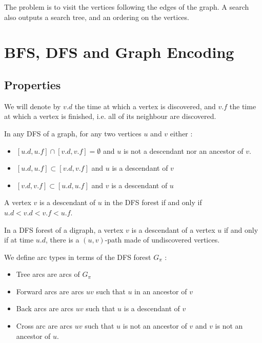 \documentclass[12pt]{cours}
\begin{document}
\begin{definition}
    The problem is to visit the vertices following the edges of the graph. A search also outputs a search tree, and an ordering on the vertices.
\end{definition}

\section{BFS, DFS and Graph Encoding}
\subsection{Properties}
\begin{definition}
    We will denote by $v.d$ the time at which a vertex is discovered, and $v.f$ the time at which a vertex is finished, i.e. all of its neighbour are discovered.
\end{definition}
\begin{theorem}
    In any DFS of a graph, for any two vertices $u$ and $v$ either :
    \begin{itemize}
        \item $\left[u.d, u.f\right]\cap \left[v.d, v.f\right] = \emptyset$ and $u$ is not a descendant nor an ancestor of $v$.
        \item $\left[u.d, u.f\right] \subset \left[v.d, v.f\right]$ and $u$ is a descendant of $v$
        \item $\left[v.d, v.f\right] \subset \left[u.d, u.f\right]$ and $v$ is a descendant of $u$
    \end{itemize}
\end{theorem}

\begin{corollary}
    A vertex $v$ is a descendant of $u$ in the DFS forest if and only if $u.d < v.d < v.f < u.f$.
\end{corollary}

\begin{theorem}
    In a DFS forest of a digraph, a vertex $v$ is a descendant of a vertex $u$ if and only if at time $u.d$, there is a $(u, v)$-path made of undiscovered vertices.
\end{theorem}

\begin{definition}
    We define arc types in terms of the DFS forest $G_{\pi}$ :
    \begin{itemize}
        \item Tree arcs are arcs of $G_{\pi}$
        \item Forward arcs are arcs $uv$ such that $u$ in an ancestor of $v$
        \item Back arcs are arcs $uv$ such that $u$ is a descendant of $v$
        \item Cross arc are arcs $uv$ such that $u$ is not an ancestor of $v$ and $v$ is not an ancestor of $u$.
    \end{itemize}
\end{definition}
\end{document}
